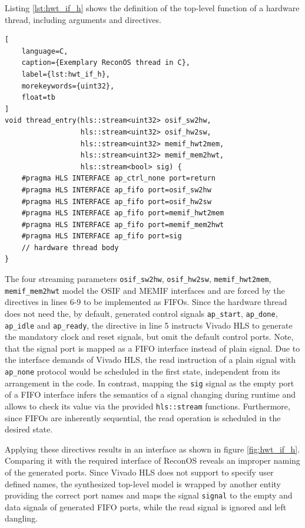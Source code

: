 Listing \ref{lst:hwt_if_h} shows the definition of the top-level function of a
hardware thread, including arguments and directives.
\begin{lstlisting}[
	language=C,
	caption={Exemplary ReconOS thread in C},
	label={lst:hwt_if_h},
	morekeywords={uint32},
	float=tb
]
void thread_entry(hls::stream<uint32> osif_sw2hw,
                  hls::stream<uint32> osif_hw2sw,
                  hls::stream<uint32> memif_hwt2mem,
                  hls::stream<uint32> memif_mem2hwt,
                  hls::stream<bool> sig) {
	#pragma HLS INTERFACE ap_ctrl_none port=return
	#pragma HLS INTERFACE ap_fifo port=osif_sw2hw
	#pragma HLS INTERFACE ap_fifo port=osif_hw2sw
	#pragma HLS INTERFACE ap_fifo port=memif_hwt2mem
	#pragma HLS INTERFACE ap_fifo port=memif_mem2hwt
	#pragma HLS INTERFACE ap_fifo port=sig
	// hardware thread body
}
\end{lstlisting}
The four streaming parameters \lstinline{osif_sw2hw}, \lstinline{osif_hw2sw},
\lstinline{memif_hwt2mem}, \lstinline{memif_mem2hwt} model the \ac{OSIF} and
\ac{MEMIF} interfaces and are forced by the directives in lines 6-9 to be
implemented as \acp{FIFO}. Since the hardware thread does not need the, by
default, generated control signals \lstinline{ap_start}, \lstinline{ap_done},
\lstinline{ap_idle} and \lstinline{ap_ready}, the directive in line 5
instructs Vivado HLS to generate the mandatory clock and reset signals, but
omit the default control ports. Note, that the signal port is mapped as a
\ac{FIFO} interface instead of plain signal. Due to the interface demands of
Vivado HLS, the read instruction of a plain signal with \lstinline{ap_none}
protocol would be scheduled in the first state, independent from its
arrangement in the code. In contrast, mapping the \lstinline{sig} signal as
the empty port of a \ac{FIFO} interface infers the semantics of a signal
changing during runtime and allows to check its value via the provided
\lstinline{hls::stream} functions. Furthermore, since \acp{FIFO} are
inherently sequential, the read operation is scheduled in the desired state.

Applying these directives results in an interface as shown in figure
\ref{fig:hwt_if_h}. Comparing it with the required interface of ReconOS
reveals an improper naming of the generated ports. Since Vivado HLS does not
support to specify user defined names, the synthesized top-level model is
wrapped by another entity providing the correct port names and maps the signal
\lstinline{signal} to the empty and data signals of generated \ac{FIFO} ports,
while the read signal is ignored and left dangling.

